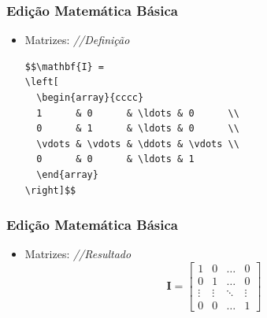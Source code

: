 \begin{frame}[fragile]
\frametitle{Edição Matemática Básica}

\begin{itemize}
  \item Matrizes:  \textit{\color{oliveGreen}//Definição}
\begin{verbatim}
$$\mathbf{I} =
\left[
  \begin{array}{cccc}
  1      & 0      & \ldots & 0      \\
  0      & 1      & \ldots & 0      \\
  \vdots & \vdots & \ddots & \vdots \\
  0      & 0      & \ldots & 1
  \end{array}
\right]$$
\end{verbatim}
\end{itemize}
 
\end{frame}

\begin{frame}[fragile]
\frametitle{Edição Matemática Básica}

\begin{itemize}
  \item Matrizes:  \textit{\color{oliveGreen}//Resultado}
$$\mathbf{I} =
\left[
  \begin{array}{cccc}
  1      & 0      & \ldots & 0      \\
  0      & 1      & \ldots & 0      \\
  \vdots & \vdots & \ddots & \vdots \\
  0      & 0      & \ldots & 1
  \end{array}
\right]$$
\end{itemize}
 
\end{frame}

